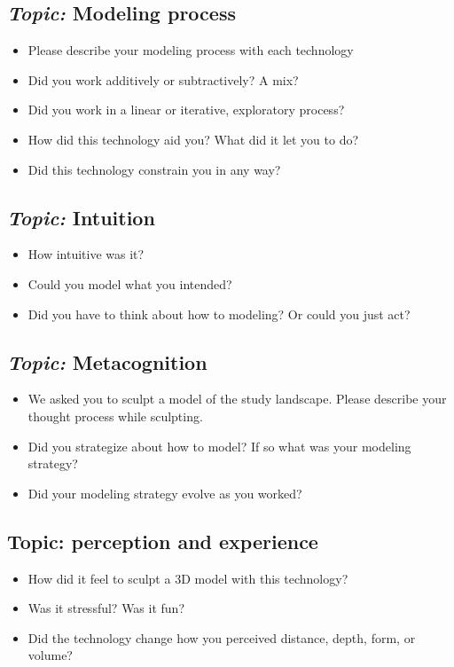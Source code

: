 \documentclass[prodmode,acmtochi]{acmsmall} %
\begin{document}
\subsection{\emph{Topic:} Modeling process}
\begin{itemize}
\item Please describe your modeling process with each technology
\item Did you work additively or subtractively? A mix?
\item Did you work in a linear or iterative, exploratory process?
\item How did this technology aid you? What did it let you to do?
\item Did this technology constrain you in any way?
\end{itemize}
\vspace*{0.5em}

\subsection{\emph{Topic:} Intuition}
\begin{itemize}
\item How intuitive was it? 
\item Could you model what you intended?
\item Did you have to think about how to modeling? Or could you just act?
\end{itemize}
\vspace*{0.5em}

\subsection{\emph{Topic:} Metacognition}
\begin{itemize}
\item We asked you to sculpt a model of the study landscape. Please describe your thought process while sculpting. 
\item Did you strategize about how to model? If so what was your modeling strategy? 
\item Did your modeling strategy evolve as you worked?
\end{itemize}
\vspace*{0.5em}

\subsection{Topic: perception and experience}
\begin{itemize}
\item How did it feel to sculpt a 3D model with this technology?
\item Was it stressful? Was it fun?
\item Did the technology change how you perceived distance, depth, form, or volume?  
\end{itemize}
\end{document}
